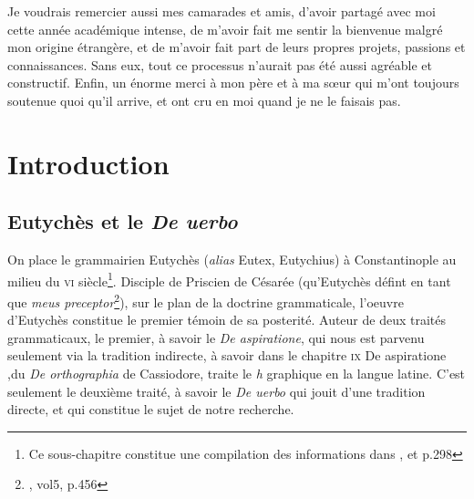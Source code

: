 \documentclass[a4paper, twoside, 12pt]{book}
\begin{document}
Je voudrais remercier aussi mes camarades et amis, d’avoir partagé avec moi cette année académique intense, de m'avoir fait me sentir la bienvenue malgré mon origine étrangère, et de m'avoir fait part de leurs propres projets, passions et connaissances. Sans eux, tout ce processus n'aurait pas été aussi agréable et constructif. Enfin, un énorme merci à mon père et à ma sœur qui m'ont toujours soutenue quoi qu'il arrive, et ont cru en moi quand je ne le faisais pas.

\tableofcontents

\clearpage

\mainmatter







\chapter{Introduction}
\section{Eutychès  et le \textit{De uerbo}}

On place le grammairien Eutychès (\textit{alias} Eutex, Eutychius) à Constantinople au milieu du \textsc{vi}\ieme{} siècle\footnote{ Ce sous-chapitre constitue une compilation des informations dans \cite{lomanto1985Eutiche}, \cite{conduche2019miseenpage} et \cite{zetzel2018critics}p.298}. Disciple de Priscien de Césarée (qu'Eutychès défint en tant que \textit{meus preceptor}\footnote{\cite{keil1857grammatici}, vol5, p.456}), sur le plan de la doctrine grammaticale,  l'oeuvre d'Eutychès constitue le premier témoin de sa posterité. Auteur de deux traités grammaticaux, le premier, à savoir le \textit{De aspiratione}, qui nous est parvenu seulement via la tradition indirecte, à savoir dans le chapitre  \textsc{ix} \og{} De aspiratione \fg{},du \textit{De orthographia} de Cassiodore, traite le \textit{h} graphique en la langue latine. C'est seulement le deuxième traité, à savoir le \textit{De uerbo} qui jouit d'une tradition directe, et qui constitue le sujet de notre recherche.
\end{document}
